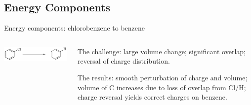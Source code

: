 \documentclass[10pt]{beamer}
\begin{document}
\subsection{Energy Components}


\begin{frame}{Energy components: chlorobenzene to benzene}

    \begin{columns}

        \begin{column}{0.65\textwidth}

\begin{center}
\hspace*{1cm}\includegraphics[scale=0.7]{figures/clhrxn.pdf}\\
\scalebox{.5}{}\hspace*{-1cm}\scalebox{.5}{}\\
\scalebox{.5}{}\hspace*{-1cm}\scalebox{.5}{}
\end{center} 

        \end{column}
        
        \begin{column}{0.3\textwidth}  
        
The challenge: large volume change; significant overlap; reversal of charge distribution.

\bigskip

The results: smooth perturbation of charge and volume; volume of C increases due to loss of overlap from Cl/H; charge reversal yields correct charges on benzene.


        \end{column}

    \end{columns}

\end{frame}
\end{document}
